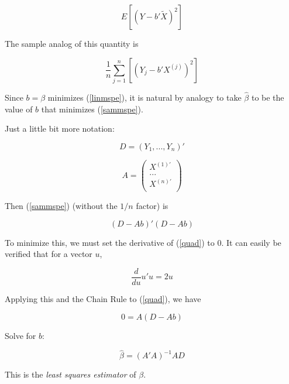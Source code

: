 \begin{equation}
\label{linmspe}
E \left [ (Y - b' \widetilde{X})^2 \right ]
\end{equation}

The sample analog of this quantity is

\begin{equation}
\label{sammspe}
\frac{1}{n}
\sum_{j=1}^n \left [ (Y_j - b' X^{(j)})^2 \right ]
\end{equation}

Since $b = \beta$ minimizes (\ref{linmspe}), it is natural by analogy to
take $\widehat{\beta}$ to be the value of $b$ that minimizes
(\ref{sammspe}).

Just a little bit more notation:

\begin{equation}
D = (Y_1,...,Y_n)'
\end{equation}

\begin{equation}
A = 
\left (
\begin{array}{r}
X^{(1)'} \\
... \\
X^{(n)'} \\
\end{array}
\right )
\end{equation}

Then (\ref{sammspe}) (without the $1/n$ factor) is

\begin{equation}
\label{quad}
(D - Ab)'(D - Ab)
\end{equation}

To minimize this, we must set the derivative of (\ref{quad}) to 0.  It
can easily be verified that for a vector $u$, 

\begin{equation}
\frac{d}{du} u'u = 2u
\end{equation}

Applying this and the Chain Rule to (\ref{quad}), we have

\begin{equation}
0 = A (D - Ab) 
\end{equation}

Solve for $b$:

\begin{equation}
\widehat{\beta} = (A'A)^{-1} AD
\end{equation}

This is the \textit{least squares estimator} of $\beta$.

